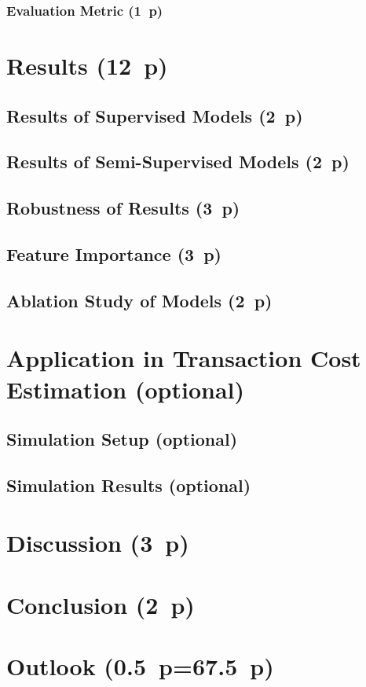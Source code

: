 \subsubsection{Evaluation Metric (1~p)}\label{sec:evaluation-metric}

\newpage
\section{Results (12~p)}\label{sec:results}

\subsection{Results of Supervised
  Models (2~p)}\label{sec:results-of-supervised-models}

\subsection{Results of Semi-Supervised
  Models (2~p)}\label{sec:results-of-semi-supervised-models}

\subsection{Robustness of Results (3~p)}\label{sec:robustness-checks}

\subsection{Feature Importance (3~p)}\label{sec:feature-importance}

\subsection{Ablation Study of Models (2~p)}\label{sec:ablation-study}

\newpage
\section{Application in Transaction Cost Estimation (optional)}\label{sec:application}
\subsection{Simulation Setup (optional)}\label{sec:simulation-setup}
\subsection{Simulation Results (optional)}\label{sec:simulation-results}

\newpage
\section{Discussion (3~p)}\label{sec:discussion}

\newpage
\section{Conclusion (2~p)}\label{sec:conclusion}

\newpage
\section{Outlook (0.5~p=67.5~p)}\label{sec:outlook}

